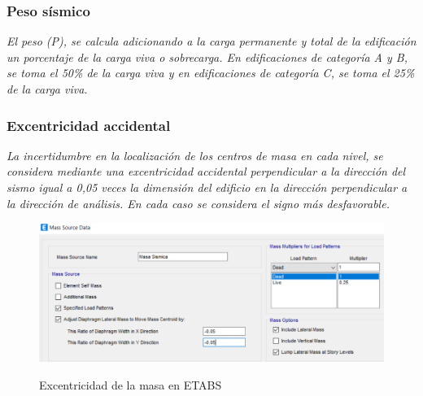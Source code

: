 \documentclass{article}%
\begin{document}
%
\subsubsection{Peso sísmico}%
\label{ssubsec:Pesossmico}%
\begin{tcolorbox}[colback=gray!5!white,colframe=Maroon!75!black,fonttitle=\bfseries,title=Art. 26]%
\textit{El peso (P), se calcula adicionando a la carga permanente y total de la edificación un porcentaje de la carga viva o sobrecarga. En edificaciones de categoría A y B, se toma el 50\% de la carga viva y en edificaciones de categoría C, se toma el 25\% de la carga viva.}%
\end{tcolorbox}%

%
\subsubsection{Excentricidad accidental}%
\label{ssubsec:Excentricidadaccidental}%
\begin{tcolorbox}[colback=gray!5!white,colframe=Maroon!75!black,fonttitle=\bfseries,title=Art. 28.5]%
\textit{La incertidumbre en la localización de los centros de masa en cada nivel, se considera mediante una excentricidad accidental perpendicular a la dirección del sismo igual a 0,05 veces la dimensión del edificio en la dirección perpendicular a la dirección de análisis. En cada caso se considera el signo más desfavorable.}%
\end{tcolorbox}%


\begin{figure}[ht!]%
\centering%
\caption{Excentricidad de la masa en ETABS}%
\includegraphics[scale=0.7]{images/excentricidad.PNG}%
\label{masa}%
\end{figure}

%
\end{document}
